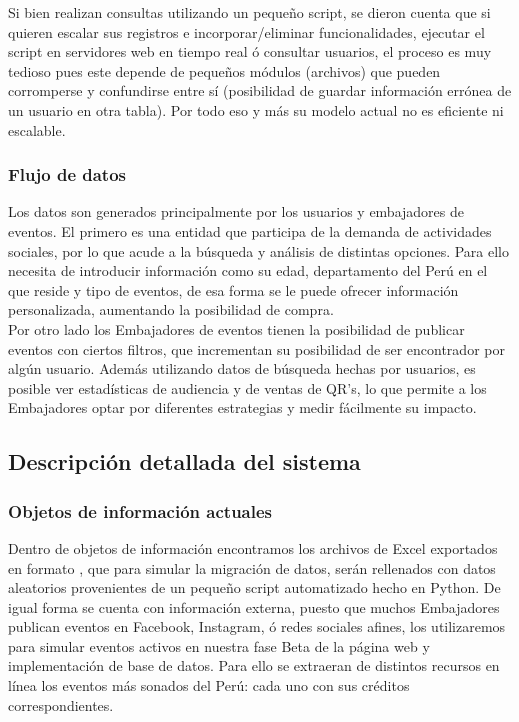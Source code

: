 Si bien realizan consultas utilizando un pequeño script, se dieron cuenta que si quieren escalar sus registros e incorporar/eliminar funcionalidades, ejecutar el script en servidores web en tiempo real ó consultar usuarios, el proceso es muy tedioso pues este depende de pequeños módulos (archivos) que pueden corromperse y confundirse entre sí (posibilidad de guardar información errónea de un usuario en otra tabla). Por todo eso y más su modelo actual no es eficiente ni escalable.\\
\subsubsection{Flujo de datos}
Los datos son generados principalmente por los usuarios y embajadores de eventos. El primero es una entidad que participa de la demanda de actividades sociales, por lo que acude a la búsqueda y análisis de distintas opciones. Para ello necesita de introducir información como su edad, departamento del Perú en el que reside y tipo de eventos, de esa forma se le puede ofrecer información personalizada, aumentando la posibilidad de compra.\\

Por otro lado los Embajadores de eventos tienen la posibilidad de publicar eventos con ciertos filtros, que incrementan su posibilidad de ser encontrador por algún usuario. Además utilizando datos de búsqueda hechas por usuarios, es posible ver estadísticas de audiencia y de ventas de QR's, lo que permite a los Embajadores optar por diferentes estrategias y medir fácilmente su impacto.\\

\subsection{Descripción detallada del sistema}
\subsubsection{Objetos de información actuales}
Dentro de objetos de información encontramos los archivos de Excel exportados en formato , que para simular la migración de datos, serán rellenados con datos aleatorios provenientes de un pequeño script automatizado hecho en Python. De igual forma se cuenta con información externa, puesto que muchos Embajadores publican eventos en Facebook, Instagram, ó redes sociales afines, los utilizaremos para simular eventos activos en nuestra fase Beta de la página web y implementación de base de datos. Para ello se extraeran de distintos recursos en línea los eventos más sonados del Perú: cada uno con sus créditos correspondientes.\\

